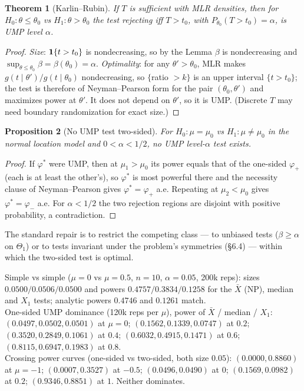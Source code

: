\documentclass[11pt]{article}
\newtheorem{theorem}{Theorem}[section]
\newtheorem{proposition}[theorem]{Proposition}
\begin{document}
\begin{theorem}[Karlin--Rubin]
If $T$ is sufficient with MLR densities, then for $H_0:\theta\le\theta_0$ vs $H_1:\theta>\theta_0$ the test rejecting iff $T>t_0$, with $P_{\theta_0}(T>t_0)=\alpha$, is UMP level $\alpha$.
\end{theorem}
\begin{proof}
\emph{Size}: $\mathbf 1\{t>t_0\}$ is nondecreasing, so by the Lemma $\beta$ is nondecreasing and $\sup_{\theta\le\theta_0}\beta=\beta(\theta_0)=\alpha$. \emph{Optimality}: for any $\theta'>\theta_0$, MLR makes $g(t\mid\theta')/g(t\mid\theta_0)$ nondecreasing, so $\{$ratio $>k\}$ is an upper interval $\{t>t_0\}$; the test is therefore of Neyman--Pearson form for the pair $(\theta_0,\theta')$ and maximizes power at $\theta'$. It does not depend on $\theta'$, so it is UMP. (Discrete $T$ may need boundary randomization for exact size.)
\end{proof}
\begin{proposition}[No UMP test two-sided]
For $H_0:\mu=\mu_0$ vs $H_1:\mu\ne\mu_0$ in the normal location model and $0<\alpha<1/2$, no UMP level-$\alpha$ test exists.
\end{proposition}
\begin{proof}
If $\varphi^*$ were UMP, then at $\mu_1>\mu_0$ its power equals that of the one-sided $\varphi_+$ (each is at least the other's), so $\varphi^*$ is most powerful there and the necessity clause of Neyman--Pearson gives $\varphi^*=\varphi_+$ a.e. Repeating at $\mu_2<\mu_0$ gives $\varphi^*=\varphi_-$ a.e. For $\alpha<1/2$ the two rejection regions are disjoint with positive probability, a contradiction.
\end{proof}
The standard repair is to restrict the competing class --- to unbiased tests ($\beta\ge\alpha$ on $\Theta_1$) or to tests invariant under the problem's symmetries (\S6.4) --- within which the two-sided test is optimal.
\begin{simbox}
Simple vs simple ($\mu=0$ vs $\mu=0.5$, $n=10$, $\alpha=0.05$, 200k reps): sizes $0.0500/0.0506/0.0500$ and powers $0.4757/0.3834/0.1258$ for the $\bar X$ (NP), median and $X_1$ tests; analytic powers $0.4746$ and $0.1261$ match.\\
One-sided UMP dominance (120k reps per $\mu$), power of $\bar X$ / median / $X_1$: $(0.0497,0.0502,0.0501)$ at $\mu=0$; $(0.1562,0.1339,0.0747)$ at $0.2$; $(0.3520,0.2849,0.1061)$ at $0.4$; $(0.6032,0.4915,0.1471)$ at $0.6$; $(0.8115,0.6947,0.1983)$ at $0.8$.\\
Crossing power curves (one-sided vs two-sided, both size $0.05$): $(0.0000,0.8860)$ at $\mu=-1$; $(0.0007,0.3527)$ at $-0.5$; $(0.0496,0.0490)$ at $0$; $(0.1569,0.0982)$ at $0.2$; $(0.9346,0.8851)$ at $1$. Neither dominates.
\end{simbox}
\end{document}
